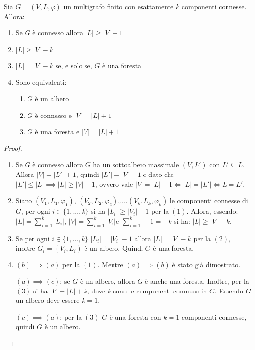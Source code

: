 \begin{teorbox}
Sia $G=(V,L,\varphi)$ un multigrafo finito con esattamente $k$ componenti connesse. Allora:
\begin{enumerate}
    \item Se $G$ è connesso allora $|L| \geq |V|-1$
    \item $|L| \geq |V|-k$
    \item $|L| = |V|-k$ se, e solo se, $G$ è una foresta
    \item Sono equivalenti: \begin{enumerate}
        \item $G$ è un albero
        \item $G$ è connesso e $|V|=|L|+1$
        \item $G$ è una foresta e $|V|=|L|+1$
    \end{enumerate}
\end{enumerate}
\end{teorbox}
\begin{proof}
	\begin{enumerate}
    \item Se $G$ è connesso allora $G$ ha un sottoalbero massimale $(V,L')$ con $L' \subseteq L$. Allora $|V|=|L'|+1$, quindi $|L'|=|V|-1$ e dato che $|L'|\leq |L| \implies |L| \geq |V|-1$, ovvero vale $|V|=|L|+1 \iff |L|=|L'| \iff L=L'$.
    \item Siano $(V_{1},L_{1},\varphi_{1})$, $(V_{2},L_{2},\varphi_{2})$,...,$(V_{k},L_{k},\varphi_{k})$ le componenti connesse di $G$, per ogni $i \in \{1,...,k\}$ si ha $|L_{i}| \geq |V_{i}|-1$ per la $(1)$. Allora, essendo:$|L|=\sum_{i=1}^{k} |L_{i}|$, $|V|=\sum_{i=1}^{k} |V_{i}|$e $\sum_{i=1}^{k} -1 = -k$ si ha: $|L| \geq |V|-k$.
    \item Se per ogni $i \in \{1,...,k\}$ $|L_{i}| = |V_{i}|-1$ allora $|L|=|V|-k$ per la $(2)$, inoltre $G_{i}=(V_{i},L_{i})$ è un albero. Quindi $G$ è una foresta.
    \item $(b) \implies (a)$ per la $(1)$. Mentre $(a) \implies (b)$ è stato già dimostrato.

    $(a) \implies (c)$: se $G$ è un albero, allora $G$ è anche una foresta. Inoltre, per la $(3)$ si ha $|V|=|L|+k$, dove $k$ sono le componenti connesse in $G$. Essendo $G$ un albero deve essere $k=1$.

    $(c) \implies (a)$: per la $(3)$ $G$ è una foresta con $k=1$ componenti connesse, quindi $G$ è un albero.
\end{enumerate}
\end{proof}
\newpage
